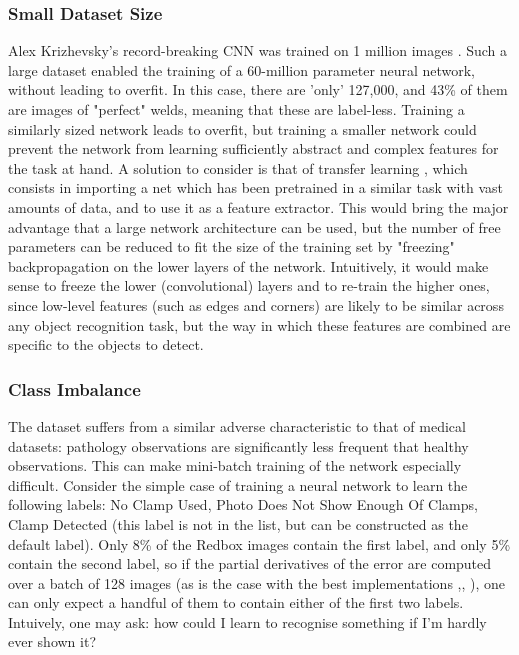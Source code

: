 \documentclass[a4paper,11pt]{article}
\begin{document}
\subsubsection{Small Dataset Size}

Alex Krizhevsky's record-breaking CNN was trained on 1 million images \cite{krizhevsky}. Such a large dataset enabled the training of a 60-million parameter neural network, without leading to overfit. In this case, there are 'only' 127,000, and 43\% of them are images of "perfect" welds, meaning that these are label-less. Training a similarly sized network leads to overfit, but training a smaller network could prevent the network from learning sufficiently abstract and complex features for the task at hand. A solution to consider is that of transfer learning \cite{transfer-learning}, which consists in importing a net which has been pretrained in a similar task with vast amounts of data, and to use it as a feature extractor. This would bring the major advantage that a large network architecture can be used, but the number of free parameters can be reduced to fit the size of the training set by "freezing" backpropagation on the lower layers of the network. Intuitively, it would make sense to freeze the lower (convolutional) layers and to re-train the higher ones, since low-level features (such as edges and corners) are likely to be similar across any object recognition task, but the way in which these features are combined are specific to the objects to detect.

\subsubsection{Class Imbalance}

The dataset suffers from a similar adverse characteristic to that of medical datasets: pathology observations are significantly less frequent that healthy observations. This can make mini-batch training of the network especially difficult. Consider the simple case of training a neural network to learn the following labels: No Clamp Used, Photo Does Not Show Enough Of Clamps, Clamp Detected (this label is not in the list, but can be constructed as the default label). Only 8\% of the Redbox images contain the first label, and only 5\% contain the second label, so if the partial derivatives of the error are computed over a batch of 128 images (as is the case with the best implementations \cite{krizhevsky},\cite{transfer-learning}, \cite{decaf}), one can only expect a handful of them to contain either of the first two labels. Intuively, one may ask: how could I learn to recognise something if I'm hardly ever shown it?\\
\end{document}
